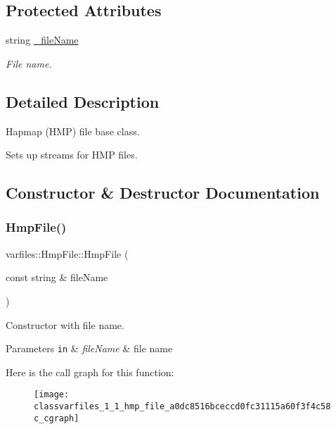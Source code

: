 \subsection*{Protected Attributes}
\begin{DoxyCompactItemize}
\item 
\mbox{\label{classvarfiles_1_1_hmp_file_abd91d75a5f4ac520752d67c58af13e96}} 
string \hyperlink{classvarfiles_1_1_hmp_file_abd91d75a5f4ac520752d67c58af13e96}{\+\_\+file\+Name}
\begin{DoxyCompactList}\small\item\em File name. \end{DoxyCompactList}\end{DoxyCompactItemize}


\subsection{Detailed Description}
Hapmap (H\+MP) file base class. 

Sets up streams for H\+MP files. 

\subsection{Constructor \& Destructor Documentation}
\mbox{\label{classvarfiles_1_1_hmp_file_a0dc8516bceccd0fc31115a60f3f4c58c}} 
\subsubsection{\texorpdfstring{Hmp\+File()}{HmpFile()}}
{\footnotesize\ttfamily varfiles\+::\+Hmp\+File\+::\+Hmp\+File (\begin{DoxyParamCaption}\item[{const string \&}]{file\+Name }\end{DoxyParamCaption})\hspace{0.3cm}{\ttfamily [inline]}}



Constructor with file name. 


\begin{DoxyParams}[1]{Parameters}
\mbox{\tt in}  & {\em file\+Name} & file name \\
\hline
\end{DoxyParams}
Here is the call graph for this function\+:\nopagebreak
\begin{figure}[H]
\begin{center}
\leavevmode
\texttt{[image: classvarfiles\_1\_1\_hmp\_file\_a0dc8516bceccd0fc31115a60f3f4c58c\_cgraph]}
\end{center}
\end{figure}


